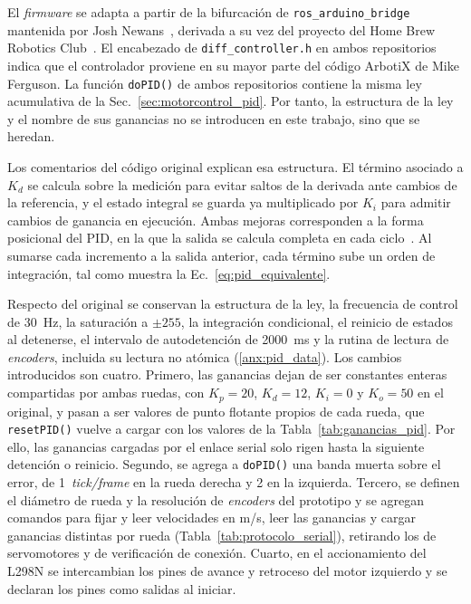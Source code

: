 \begin{appendices}
El \textit{firmware} se adapta a partir de la bifurcación de
\texttt{ros\_arduino\_bridge} mantenida por Josh
Newans~\citep{newans_rosarduinobridge}, derivada a su vez del proyecto del
Home Brew Robotics Club~\citep{hbrobotics_rosarduinobridge}. El encabezado de
\texttt{diff\_controller.h} en ambos repositorios indica que el controlador
proviene en su mayor parte del código ArbotiX de Mike Ferguson. La función
\texttt{doPID()} de ambos repositorios contiene la misma ley acumulativa de la
Sec.~\ref{sec:motorcontrol_pid}. Por tanto, la estructura de la ley y el nombre
de sus ganancias no se introducen en este trabajo, sino que se heredan.

Los comentarios del código original explican esa estructura. El término
asociado a $K_d$ se calcula sobre la medición para evitar saltos de la
derivada ante cambios de la referencia, y el estado integral se guarda ya
multiplicado por $K_i$ para admitir cambios de ganancia en ejecución. Ambas
mejoras corresponden a la forma posicional del PID, en la que la salida se
calcula completa en cada ciclo~\citep[Sec.~13.4]{astrom2009controlpid}. Al sumarse cada incremento a la salida
anterior, cada término sube un orden de integración, tal como muestra la
Ec.~\eqref{eq:pid_equivalente}.

Respecto del original se conservan la estructura de la ley, la frecuencia de
control de 30~Hz, la saturación a $\pm255$, la integración condicional, el
reinicio de estados al detenerse, el intervalo de autodetención de 2000~ms y
la rutina de lectura de \textit{encoders}, incluida su lectura no atómica
(\ref{anx:pid_data}). Los cambios introducidos son cuatro. Primero, las
ganancias dejan de ser constantes enteras compartidas por ambas ruedas, con
$K_p=20$, $K_d=12$, $K_i=0$ y $K_o=50$ en el original, y pasan a ser valores
de punto flotante propios de cada rueda, que \texttt{resetPID()} vuelve a
cargar con los valores de la Tabla~\ref{tab:ganancias_pid}. Por ello, las
ganancias cargadas por el enlace serial solo rigen hasta la siguiente
detención o reinicio. Segundo, se agrega a \texttt{doPID()} una banda muerta
sobre el error, de 1~\textit{tick/frame} en la rueda derecha y 2 en la izquierda.
Tercero, se definen el diámetro de rueda y la resolución de \textit{encoders} del
prototipo y se agregan comandos para fijar y leer velocidades en m/s, leer
las ganancias y cargar ganancias distintas por rueda
(Tabla~\ref{tab:protocolo_serial}), retirando los de servomotores y de
verificación de conexión. Cuarto, en el accionamiento del L298N se
intercambian los pines de avance y retroceso del motor izquierdo y se
declaran los pines como salidas al iniciar.


\end{appendices}
